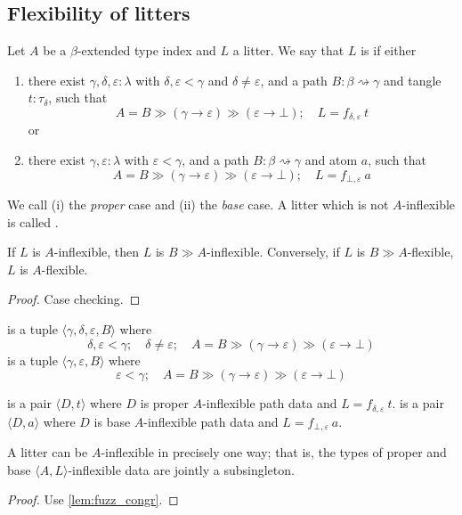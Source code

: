 \subsection{Flexibility of litters}
\begin{definition}
    Let \( A \) be a \( \beta \)-extended type index and \( L \) a litter.
    We say that \( L \) is  if either
    \begin{enumerate}
        \item there exist \( \gamma, \delta, \varepsilon : \lambda \) with \( \delta, \varepsilon < \gamma \) and \( \delta \neq \varepsilon \), and a path \( B : \beta \rightsquigarrow \gamma \) and tangle \( t : \tau_\delta \), such that
        \[ A = B \gg (\gamma \to \varepsilon) \gg (\varepsilon \to \bot);\quad L = f_{\delta,\varepsilon}\ t \]
        or
        \item there exist \( \gamma, \varepsilon : \lambda \) with \( \varepsilon < \gamma \), and a path \( B : \beta \rightsquigarrow \gamma \) and atom \( a \), such that
        \[ A = B \gg (\gamma \to \varepsilon) \gg (\varepsilon \to \bot);\quad L = f_{\bot,\varepsilon}\ a \]
    \end{enumerate}
    We call (i) the \emph{proper} case and (ii) the \emph{base} case.
    A litter which is not \( A \)-inflexible is called .
\end{definition}
\begin{lemma}
    \label{lem:comp_flexible}
    If \( L \) is \( A \)-inflexible, then \( L \) is \( B \gg A \)-inflexible.
    Conversely, if \( L \) is \( B \gg A \)-flexible, \( L \) is \( A \)-flexible.
\end{lemma}
\begin{proof}
    Case checking.
\end{proof}
\begin{definition}
     is a tuple \( \langle \gamma, \delta, \varepsilon, B \rangle \) where
    \[ \delta, \varepsilon < \gamma;\quad \delta \neq \varepsilon; \quad A = B \gg (\gamma \to \varepsilon) \gg (\varepsilon \to \bot) \]
     is a tuple \( \langle \gamma, \varepsilon, B \rangle \) where
    \[ \varepsilon < \gamma; \quad A = B \gg (\gamma \to \varepsilon) \gg (\varepsilon \to \bot) \]
\end{definition}
\begin{definition}
     is a pair \( \langle D, t \rangle \) where \( D \) is proper \( A \)-inflexible path data and \( L = f_{\delta,\varepsilon}\ t \).
     is a pair \( \langle D, a \rangle \) where \( D \) is base \( A \)-inflexible path data and \( L = f_{\bot,\varepsilon}\ a \).
\end{definition}
\begin{lemma}
    A litter can be \( A \)-inflexible in precisely one way; that is, the types of proper and base \( \langle A, L \rangle \)-inflexible data are jointly a subsingleton.
\end{lemma}
\begin{proof}
    Use \cref{lem:fuzz_congr}.
\end{proof}
